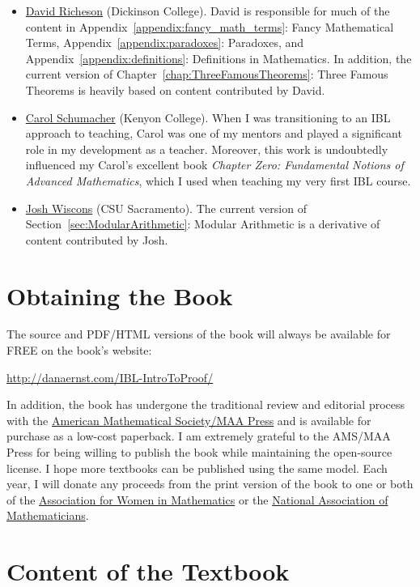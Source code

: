 \documentclass[11pt]{article}%
\begin{document}
\begin{itemize}
\item \href{https://divisbyzero.com}{David Richeson} (Dickinson College). David is responsible for much of the content in Appendix~\ref{appendix:fancy_math_terms}: Fancy Mathematical Terms, Appendix~\ref{appendix:paradoxes}: Paradoxes, and Appendix~\ref{appendix:definitions}: Definitions in Mathematics. In addition, the current version of Chapter~\ref{chap:ThreeFamousTheorems}: Three Famous Theorems is heavily based on content contributed by David.
\item \href{http://www2.kenyon.edu/Depts/Math/schumacherc/public_html/}{Carol Schumacher} (Kenyon College). When I was transitioning to an IBL approach to teaching, Carol was one of my mentors and played a significant role in my development as a teacher.  Moreover, this work is undoubtedly influenced my Carol's excellent book \emph{Chapter Zero: Fundamental Notions of Advanced Mathematics}, which I used when teaching my very first IBL course.
\item \href{http://webpages.csus.edu/wiscons/}{Josh Wiscons} (CSU Sacramento). The current version of Section~\ref{sec:ModularArithmetic}: Modular Arithmetic is a derivative of content contributed by Josh.
\end{itemize}

\section*{Obtaining the Book}

The source and PDF/HTML versions of the book will always be available for FREE on the book's website:

\begin{center}
\url{http://danaernst.com/IBL-IntroToProof/}
\end{center}


In addition, the book has undergone the traditional review and editorial process with the \href{https://bookstore.ams.org/maa-press-browse}{American Mathematical Society/MAA Press} and is available for purchase as a low-cost paperback.  I am extremely grateful to the AMS/MAA Press for being willing to publish the book while maintaining the open-source license. I hope more textbooks can be published using the same model. Each year, I will donate any proceeds from the print version of the book to one or both of the \href{https://awm-math.org}{Association for Women in Mathematics} or the \href{https://www.nam-math.org}{National Association of Mathematicians}.

\section*{Content of the Textbook}
\end{document}
